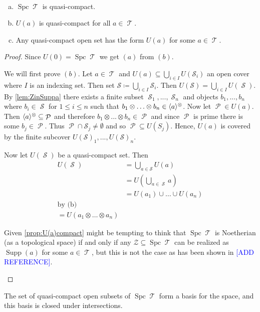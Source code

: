 \documentclass[11pt]{article}
\DeclareMathOperator{\cS}{\mathcal{S}}
\DeclareMathOperator{\TT}{\mathcal{T}}
\DeclareMathOperator{\cP}{\mathcal{P}}
\DeclareMathOperator{\supp}{Supp}
\DeclareMathOperator{\spc}{Spc}
\begin{document}
\begin{prop}\label{prop:U(a)compact}
	\
\begin{enumerate}[(a)]
	\item $\spc \TT$ is quasi-compact.
	\item $U(a)$ is quasi-compact for all $a \in \TT$.
	\item Any quasi-compact open set has the form $U(a)$ for some $a \in \TT$.
\end{enumerate}
\end{prop}
\begin{proof}
Since $U(0) = \spc\TT$ we get $(a)$ from $(b)$.

We will first prove $(b)$. Let $a \in \TT$ and $U(a) \subseteq \bigcup_{i \in I}U(\mathcal{S}_i)$ an open cover where $I$ is an indexing set. Then set $\mathcal{S} \coloneqq \bigcup_{i \in I}\mathcal{S}_i$. Then $U(\mathcal{S}) = \bigcup_{i \in I}U(\cS)$. By \autoref{lem:ZinSuppa} there exists a finite subset $\cS_1,...,\cS_n$ and objects $b_1,...,b_n$ where $b_i \in \cS$ for $1 \leq i \leq n$ such that $b_1 \otimes \hdots \otimes b_n \in \langle a \rangle^{\otimes}$. Now let $\cP \in U(a)$. Then $\la a \ra^{\otimes} \subseteq \cP$ and therefore $ b_1 \otimes...\otimes b_n \in \cP$ and since $\cP$ is prime there is some $b_j \in \cP$. Thus $\cP \cap \mathcal{S}_j \not=\emptyset$ and so $\cP \subseteq U(S_j)$. Hence, $U(a)$ is covered by the finite subcover $U(\mathcal{S})_1,...,U(\mathscr{S})_n$.

Now let $U(\cS)$ be a quasi-compact set. Then
\begin{align*}
	U(\cS) &= \bigcup_{a \in \mathcal{S}}U(a)\\
	       &= U\left( \bigcup_{a \in \cS}a\right)\\
	       &=U(a_1) \cup \hdots \cup U(a_n)\\ \text{by (b)}\\
	       = U(a_1 \otimes \hdots \otimes a_n)
\end{align*}
\begin{rmk}
	Given \autoref{prop:U(a)compact} might be tempting to think that $\spc \TT$ is Noetherian (as a topological space) if and only if any $\mathcal{Z} \subseteq \spc \TT$ can be realized as $\supp(a)$ for some $a \in \TT$, but this is not the case as has been shown in \textcolor{blue}{[ADD REFERENCE]}.
\end{rmk}
\end{proof}

\begin{cor}
The set of quasi-compact open subsets of $\spc \TT$ form a basis for the space, and this basis is closed under intersections.
\end{cor}
\end{document}

